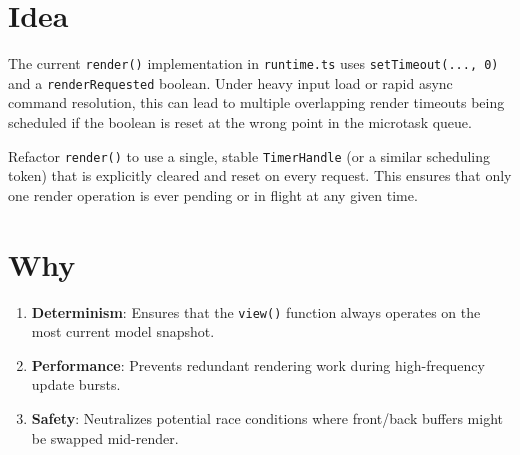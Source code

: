 \section{Idea}\label{record-379-idea}

The current \texttt{r\allowbreak{}e\allowbreak{}n\allowbreak{}d\allowbreak{}e\allowbreak{}r\allowbreak{}(\allowbreak{})} implementation in \texttt{r\allowbreak{}u\allowbreak{}n\allowbreak{}t\allowbreak{}i\allowbreak{}m\allowbreak{}e\allowbreak{}.\allowbreak{}t\allowbreak{}s} uses \texttt{s\allowbreak{}e\allowbreak{}t\allowbreak{}T\allowbreak{}i\allowbreak{}m\allowbreak{}e\allowbreak{}o\allowbreak{}u\allowbreak{}t\allowbreak{}(\allowbreak{}.\allowbreak{}.\allowbreak{}.\allowbreak{},\allowbreak{} \allowbreak{}0\allowbreak{})} and a \texttt{r\allowbreak{}e\allowbreak{}n\allowbreak{}d\allowbreak{}e\allowbreak{}r\allowbreak{}R\allowbreak{}e\allowbreak{}q\allowbreak{}u\allowbreak{}e\allowbreak{}s\allowbreak{}t\allowbreak{}e\allowbreak{}d} boolean. Under heavy input load or rapid async command resolution, this can lead to multiple overlapping render timeouts being scheduled if the boolean is reset at the wrong point in the microtask queue.

Refactor \texttt{r\allowbreak{}e\allowbreak{}n\allowbreak{}d\allowbreak{}e\allowbreak{}r\allowbreak{}(\allowbreak{})} to use a single, stable \texttt{T\allowbreak{}i\allowbreak{}m\allowbreak{}e\allowbreak{}r\allowbreak{}H\allowbreak{}a\allowbreak{}n\allowbreak{}d\allowbreak{}l\allowbreak{}e} (or a similar scheduling token) that is explicitly cleared and reset on every request. This ensures that only one render operation is ever pending or in flight at any given time.

\section{Why}\label{record-379-why}

\begin{enumerate}
\def\labelenumi{\arabic{enumi}.}
\tightlist
\item
  \textbf{Determinism}: Ensures that the \texttt{v\allowbreak{}i\allowbreak{}e\allowbreak{}w\allowbreak{}(\allowbreak{})} function always operates on the most current model snapshot.
\item
  \textbf{Performance}: Prevents redundant rendering work during high-frequency update bursts.
\item
  \textbf{Safety}: Neutralizes potential race conditions where front/back buffers might be swapped mid-render.
\end{enumerate}

